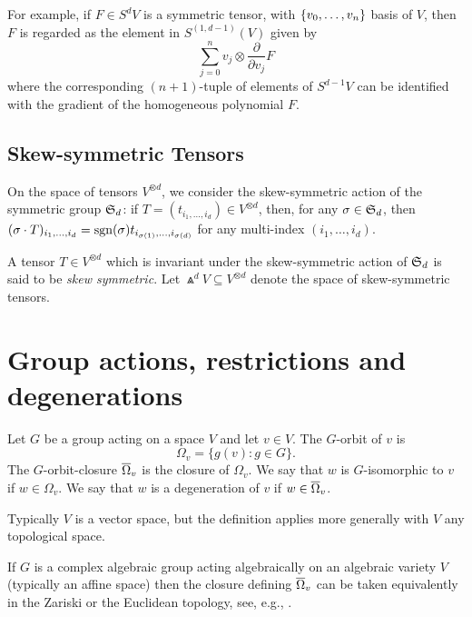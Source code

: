 For example, if $F \in S^d V$ is a symmetric tensor, with $\{v_0 , \ldots , v_n\}$ basis of $V$, then $F$ is regarded as the element in $S^{(1,d-1)}(V)$ given by 
\[
    \sum_{j=0}^n v_j \otimes \textstyle\frac{\partial }{\partial v_j} F
\]
where the corresponding $(n+1)$-tuple of elements of $S^{d-1} V$ can be identified with the gradient of the homogeneous polynomial $F$.
\subsection{Skew-symmetric Tensors}\label{introduction-subsection-skew_symmetric_tensors}
On the space of tensors $V^{\otimes d}$, we consider the skew-symmetric action of the symmetric group $\mathfrak{S}_d$: if $T = (t_{i_1,\ldots,i_d}) \in V^{\otimes d}$, then, for any $\sigma \in \mathfrak{S}_d$, then $(\sigma \cdot T)_{i_1,\ldots,i_d} = \operatorname{sgn}(\sigma)t_{i_{\sigma(1)},\ldots,i_{\sigma(d)}}$ for any multi-index $(i_1,\ldots,i_d)$.
\begin{definition}\label{introduction-definition-skew_symmetric_tensors}
    A tensor $T \in V^{\otimes d}$ which is invariant under the skew-symmetric action of $\mathfrak{S}_d$ is said to be \emph{skew symmetric}. Let $\Wedge^d V \subseteq V^{\otimes d}$ denote the space of skew-symmetric tensors. 
\end{definition}

\section{Group actions, restrictions and degenerations}
\label{introduction-section-groupactions}

\begin{definition}
\label{introduction-definition-orbitsdegenerations}
Let $G$ be a group acting on a space $V$ and let $v \in V$. The $G$-orbit of $v$ is 
\[
\Omega_v = \{ g(v) : g \in G \}.
\]
The $G$-orbit-closure $\overline{\Omega}_v$ is the closure of $\Omega_v$. We say that $w$ is $G$-isomorphic to $v$ if $w \in \Omega_v$. We say that $w$ is a degeneration of $v$ if $w \in \overline{\Omega}_v$.

Typically $V$ is a vector space, but the definition applies more generally with $V$ any topological space.
\end{definition}

If $G$ is a complex algebraic group acting algebraically on an algebraic variety $V$ (typically an affine space) then the closure defining $\overline{\Omega}_v$ can be taken equivalently in the Zariski or the Euclidean topology, see, e.g., \cite[Thm. 2.33]{Mum76}.

